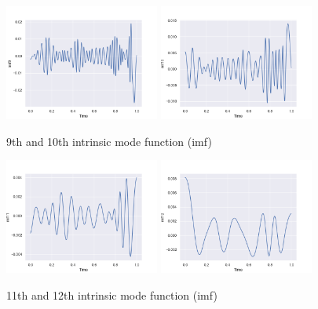 \documentclass[11pt, oneside]{article}   	%
\begin{document}
\begin{flushleft}
\begin{figure}[H] %
   \centering
   \includegraphics[width=2in]{imf/imf9.png} 
     \includegraphics[width=2in]{imf/imf10.png} 
   \caption{9th and 10th intrinsic mode function (imf)}
   \label{fig:imf910}
\end{figure}

\begin{figure}[H] %
   \centering
   \includegraphics[width=2in]{imf/imf11.png} 
     \includegraphics[width=2in]{imf/imf12.png} 
   \caption{11th and 12th intrinsic mode function (imf)}
   \label{fig:imf1112}
\end{figure}


\end{flushleft}
\end{document}
